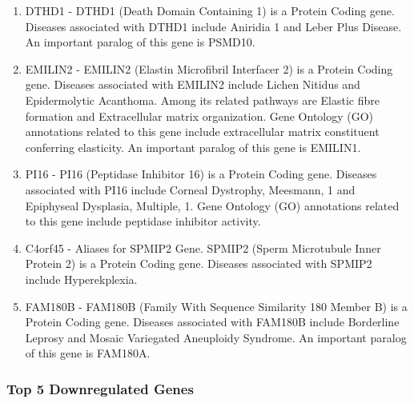 \documentclass[
]{article}
\newenvironment{Shaded}{\begin{snugshade}}{\end{snugshade}}
\newcommand{\DecValTok}[1]{\textcolor[rgb]{0.00,0.00,0.81}{#1}}
\newcommand{\FloatTok}[1]{\textcolor[rgb]{0.00,0.00,0.81}{#1}}
\newcommand{\FunctionTok}[1]{\textcolor[rgb]{0.13,0.29,0.53}{\textbf{#1}}}
\newcommand{\NormalTok}[1]{#1}
\newcommand{\OtherTok}[1]{\textcolor[rgb]{0.56,0.35,0.01}{#1}}
\newcommand{\SpecialCharTok}[1]{\textcolor[rgb]{0.81,0.36,0.00}{\textbf{#1}}}
\begin{document}
\begin{enumerate}
\def\labelenumi{\arabic{enumi}.}
\item
  DTHD1 - DTHD1 (Death Domain Containing 1) is a Protein Coding gene.
  Diseases associated with DTHD1 include Aniridia 1 and Leber Plus
  Disease. An important paralog of this gene is PSMD10.
\item
  EMILIN2 - EMILIN2 (Elastin Microfibril Interfacer 2) is a Protein
  Coding gene. Diseases associated with EMILIN2 include Lichen Nitidus
  and Epidermolytic Acanthoma. Among its related pathways are Elastic
  fibre formation and Extracellular matrix organization. Gene Ontology
  (GO) annotations related to this gene include extracellular matrix
  constituent conferring elasticity. An important paralog of this gene
  is EMILIN1.
\item
  PI16 - PI16 (Peptidase Inhibitor 16) is a Protein Coding gene.
  Diseases associated with PI16 include Corneal Dystrophy, Meesmann, 1
  and Epiphyseal Dysplasia, Multiple, 1. Gene Ontology (GO) annotations
  related to this gene include peptidase inhibitor activity.
\item
  C4orf45 - Aliases for SPMIP2 Gene. SPMIP2 (Sperm Microtubule Inner
  Protein 2) is a Protein Coding gene. Diseases associated with SPMIP2
  include Hyperekplexia.
\item
  FAM180B - FAM180B (Family With Sequence Similarity 180 Member B) is a
  Protein Coding gene. Diseases associated with FAM180B include
  Borderline Leprosy and Mosaic Variegated Aneuploidy Syndrome. An
  important paralog of this gene is FAM180A.
\end{enumerate}

\subsubsection{Top 5 Downregulated
Genes}\label{top-5-downregulated-genes}

\begin{Shaded}
\end{Shaded}
\end{document}
